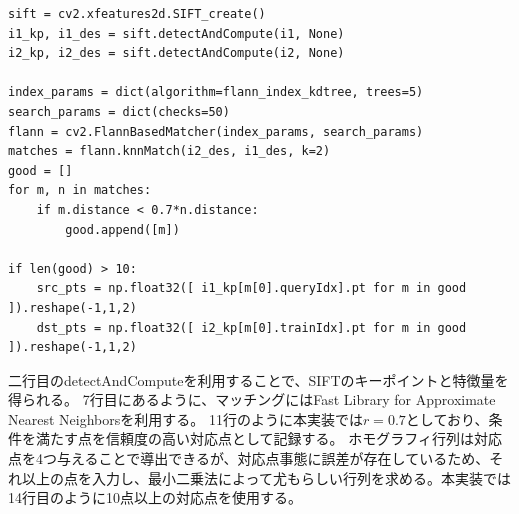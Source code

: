 \begin{lstlisting}[caption=対応点マッチング, label=py:sift_match]
sift = cv2.xfeatures2d.SIFT_create()
i1_kp, i1_des = sift.detectAndCompute(i1, None)
i2_kp, i2_des = sift.detectAndCompute(i2, None)

index_params = dict(algorithm=flann_index_kdtree, trees=5)
search_params = dict(checks=50)
flann = cv2.FlannBasedMatcher(index_params, search_params)
matches = flann.knnMatch(i2_des, i1_des, k=2)
good = []
for m, n in matches:
    if m.distance < 0.7*n.distance:
        good.append([m])

if len(good) > 10:
    src_pts = np.float32([ i1_kp[m[0].queryIdx].pt for m in good ]).reshape(-1,1,2)
    dst_pts = np.float32([ i2_kp[m[0].trainIdx].pt for m in good ]).reshape(-1,1,2)
\end{lstlisting}
二行目のdetectAndComputeを利用することで、SIFTのキーポイントと特徴量を得られる。
7行目にあるように、マッチングにはFast Library for Approximate Nearest Neighbors\cite{flann}を利用する。
11行のように本実装では$r=0.7$としており、条件を満たす点を信頼度の高い対応点として記録する。
ホモグラフィ行列は対応点を4つ与えることで導出できるが、対応点事態に誤差が存在しているため、それ以上の点を入力し、最小二乗法によって尤もらしい行列を求める。本実装では14行目のように10点以上の対応点を使用する。


